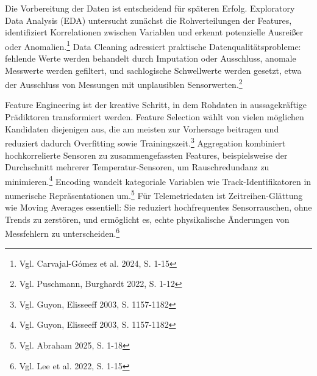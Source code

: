 Die Vorbereitung der Daten ist entscheidend für späteren Erfolg. Exploratory Data Analysis (EDA) untersucht zunächst die Rohverteilungen der Features, identifiziert Korrelationen zwischen Variablen und erkennt potenzielle Ausreißer oder Anomalien.\footnote{Vgl. Carvajal-Gómez et al. 2024, S. 1-15} Data Cleaning adressiert praktische Datenqualitätsprobleme: fehlende Werte werden behandelt durch Imputation oder Ausschluss, anomale Messwerte werden gefiltert, und sachlogische Schwellwerte werden gesetzt, etwa der Ausschluss von Messungen mit unplausiblen Sensorwerten.\footnote{Vgl. Puschmann, Burghardt 2022, S. 1-12}

Feature Engineering ist der kreative Schritt, in dem Rohdaten in aussagekräftige Prädiktoren transformiert werden. Feature Selection wählt von vielen möglichen Kandidaten diejenigen aus, die am meisten zur Vorhersage beitragen und reduziert dadurch Overfitting sowie Trainingszeit.\footnote{Vgl. Guyon, Elisseeff 2003, S. 1157-1182} Aggregation kombiniert hochkorrelierte Sensoren zu zusammengefassten Features, beispielsweise der Durchschnitt mehrerer Temperatur-Sensoren, um Rauschredundanz zu minimieren.\footnote{Vgl. Guyon, Elisseeff 2003, S. 1157-1182} Encoding wandelt kategoriale Variablen wie Track-Identifikatoren in numerische Repräsentationen um.\footnote{Vgl. Abraham 2025, S. 1-18} Für Telemetriedaten ist Zeitreihen-Glättung wie Moving Averages essentiell: Sie reduziert hochfrequentes Sensorrauschen, ohne Trends zu zerstören, und ermöglicht es, echte physikalische Änderungen von Messfehlern zu unterscheiden.\footnote{Vgl. Lee et al. 2022, S. 1-15}

